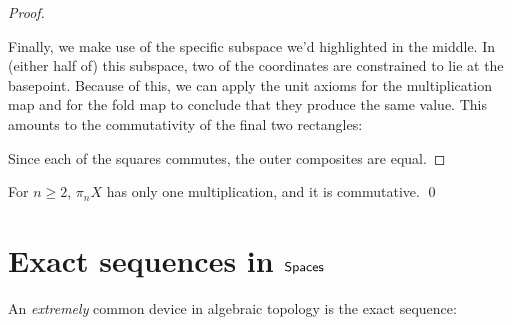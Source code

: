\begin{proof}
\begin{center}
\end{center}
Finally, we make use of the specific subspace we'd highlighted in the middle.
In (either half of) this subspace, two of the coordinates are constrained to lie at the basepoint.
Because of this, we can apply the unit axioms for the multiplication map and for the fold map to conclude that they produce the same value.
This amounts to the commutativity of the final two rectangles:
\begin{center}
\end{center}
Since each of the squares commutes, the outer composites are equal.
\end{proof}

\begin{corollary}
For $n \ge 2$, $\pi_n X$ has only one multiplication, and it is commutative. \qed
\end{corollary}




\section{Exact sequences in $\mathsf{Spaces}$}

An \emph{extremely} common device in algebraic topology is the exact sequence:

